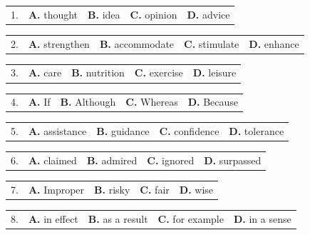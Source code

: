 \documentclass[UTF8,11pt]{ctexart}
\begin{document}
\noindent\begin{tabularx}{\linewidth}{@{}lXXXX@{}}1. & \textbf{A.} thought & \textbf{B.} idea & \textbf{C.} opinion & \textbf{D.} advice\\\end{tabularx}\par

\noindent\begin{tabularx}{\linewidth}{@{}lXXXX@{}}2. & \textbf{A.} strengthen & \textbf{B.} accommodate & \textbf{C.} stimulate & \textbf{D.} enhance\\\end{tabularx}\par

\noindent\begin{tabularx}{\linewidth}{@{}lXXXX@{}}3. & \textbf{A.} care & \textbf{B.} nutrition & \textbf{C.} exercise & \textbf{D.} leisure\\\end{tabularx}\par

\noindent\begin{tabularx}{\linewidth}{@{}lXXXX@{}}4. & \textbf{A.} If & \textbf{B.} Although & \textbf{C.} Whereas & \textbf{D.} Because\\\end{tabularx}\par

\noindent\begin{tabularx}{\linewidth}{@{}lXXXX@{}}5. & \textbf{A.} assistance & \textbf{B.} guidance & \textbf{C.} confidence & \textbf{D.} tolerance\\\end{tabularx}\par

\noindent\begin{tabularx}{\linewidth}{@{}lXXXX@{}}6. & \textbf{A.} claimed & \textbf{B.} admired & \textbf{C.} ignored & \textbf{D.} surpassed\\\end{tabularx}\par

\noindent\begin{tabularx}{\linewidth}{@{}lXXXX@{}}7. & \textbf{A.} Improper & \textbf{B.} risky & \textbf{C.} fair & \textbf{D.} wise\\\end{tabularx}\par

\noindent\begin{tabularx}{\linewidth}{@{}lXXXX@{}}8. & \textbf{A.} in effect & \textbf{B.} as a result & \textbf{C.} for example & \textbf{D.} in a sense\\\end{tabularx}\par
\end{document}
